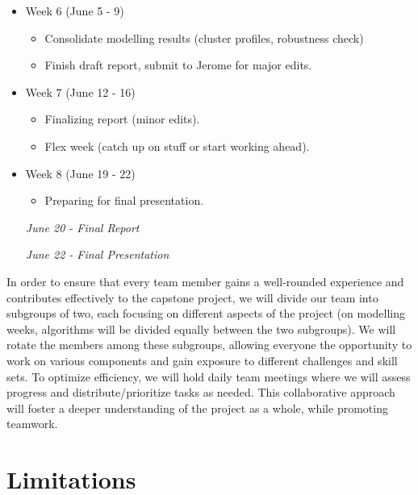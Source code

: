 \documentclass[11pt, a4paper]{article}
\begin{document}
\begin{itemize}
\item Week 6  \dotfill (June 5 - 9)
\begin{itemize}
\item Consolidate modelling results (cluster profiles, robustness check)
\item Finish draft report, submit to Jerome for major edits.
\end{itemize}

\item Week 7  \dotfill (June 12 - 16)
\begin{itemize}
\item Finalizing report (minor edits).
\item Flex week (catch up on stuff or start working ahead).
\end{itemize}

\item Week 8  \dotfill (June 19 - 22)
\begin{itemize}
\item Preparing for final presentation.
\end{itemize}

\textit{June 20 - Final Report}
\par
\textit{June 22 - Final Presentation}

\end{itemize}

\vspace{0.5pc}

In order to ensure that every team member gains a well-rounded experience and contributes effectively to the capstone project, we will divide our team into subgroups of two, each focusing on different aspects of the project (on modelling weeks, algorithms will be divided equally between the two subgroups). We will rotate the members among these subgroups, allowing everyone the opportunity to work on various components and gain exposure to different challenges and skill sets. To optimize efficiency, we will hold daily team meetings where we will assess progress and distribute/prioritize tasks as needed. This collaborative approach will foster a deeper understanding of the project as a whole, while promoting teamwork.




\section*{Limitations}
\end{document}
